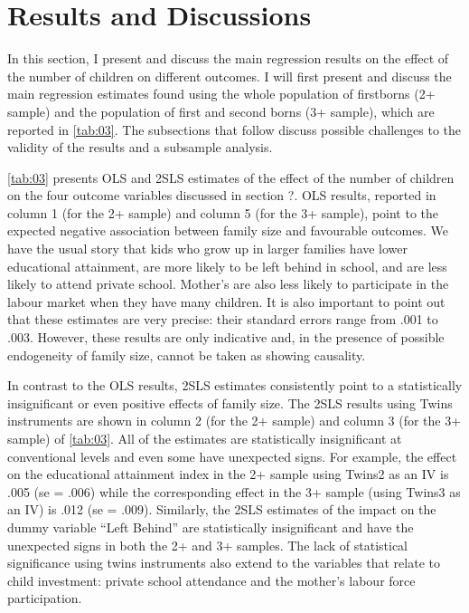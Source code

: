 
\section{Results and Discussions}

In this section, I present and discuss the main regression results on the effect of the number of children on different outcomes. I will first present and discuss the main regression estimates found using the whole population of firstborns (2+ sample) and the population of first and second borns (3+ sample), which are reported in \autoref{tab:03}. The subsections that follow discuss possible challenges to the validity of the results and a subsample analysis.

\autoref{tab:03} presents OLS and 2SLS estimates of the effect of the number of children on the four outcome variables discussed in section ?. OLS results, reported in column 1 (for the 2+ sample) and column 5 (for the 3+ sample), point to the expected negative association between family size and favourable outcomes. We have the usual story that kids who grow up in larger families have lower educational attainment, are more likely to be left behind in school, and are less likely to attend private school. Mother’s are also less likely to participate in the labour market when they have many children. It is also important to point out that these estimates are very precise: their standard errors range from .001 to .003. However, these results are only indicative and, in the presence of possible endogeneity of family size, cannot be taken as showing causality.

In contrast to the OLS results, 2SLS estimates consistently point to a statistically insignificant or even positive effects of family size. The 2SLS results using Twins instruments are shown in column 2 (for the 2+ sample) and column 3 (for the 3+ sample) of \autoref{tab:03}. All of the estimates are statistically insignificant at conventional levels and even some have unexpected signs. For example, the effect on the educational attainment index in the 2+ sample using Twins2 as an IV is .005 (se = .006) while the corresponding effect in the 3+ sample (using Twins3 as an IV) is .012 (se = .009). Similarly, the 2SLS estimates of the impact on the dummy variable “Left Behind” are statistically insignificant and have the unexpected signs in both the 2+ and 3+ samples. The lack of statistical significance using twins instruments also extend to the variables that relate to child investment: private school attendance and the mother’s labour force participation. 

